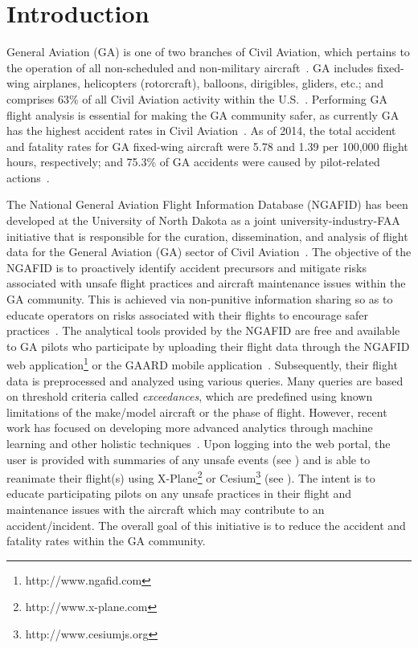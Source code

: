 
\chapter{Introduction} \label{ch:introduction}

	General Aviation (GA) is one of two branches of Civil Aviation, which pertains to the operation of all non-scheduled and non-military aircraft~\cite{aopa2009what,allen2006general,federal-aviation-administration2016the-economic,kenny201726th}.  GA includes fixed-wing airplanes, helicopters (rotorcraft), balloons, dirigibles, gliders, etc.; and comprises 63\% of all Civil Aviation activity within the U.S.~\cite{aopa2009what,federal-aviation-administration2016the-economic,shetty2012current}.  Performing GA flight analysis is essential for making the GA community safer, as currently GA has the highest accident rates in Civil Aviation~\cite{kenny201726th,aopa-air-safety-institute20172015-2016}.  As of 2014, the total accident and fatality rates for GA fixed-wing aircraft were 5.78 and 1.39 per 100,000 flight hours, respectively; and 75.3\% of GA accidents were caused by pilot-related actions~\cite{kenny201726th}.

	The National General Aviation Flight Information Database (NGAFID) has been developed at the University of North Dakota as a joint university-industry-FAA initiative that is responsible for the curation, dissemination, and analysis of flight data for the General Aviation (GA) sector of Civil Aviation~\cite{clacharlarge-scale,url_ngafid}.  The objective of the NGAFID is to proactively identify accident precursors and mitigate risks associated with unsafe flight practices and aircraft maintenance issues within the GA community.  This is achieved via non-punitive information sharing so as to educate operators on risks associated with their flights to encourage safer practices~\cite{clacharlarge-scale}.  The analytical tools provided by the NGAFID are free and available to GA pilots who participate by uploading their flight data through the NGAFID web application\footnote{http://www.ngafid.com} or the GAARD mobile application~\cite{url_gaard}.  Subsequently, their flight data is preprocessed and analyzed using various queries.  Many queries are based on threshold criteria called \textit{exceedances}, which are predefined using known limitations of the make/model aircraft or the phase of flight. However, recent work has focused on developing more advanced analytics through machine learning and other holistic techniques~\cite{sophine2014identifying,sophine2016phd,desell2015evolving,elsaid2016vibration,elsaid2016thesis,desell2014evolving}.  Upon logging into the web portal, the user is provided with summaries of any unsafe events (see ) and is able to reanimate their flight(s) using X-Plane\footnote{http://www.x-plane.com} or Cesium\footnote{http://www.cesiumjs.org} (see ).  The intent is to educate participating pilots on any unsafe practices in their flight and maintenance issues with the aircraft which may contribute to an accident/incident. The overall goal of this initiative is to reduce the accident and fatality rates within the GA community.


